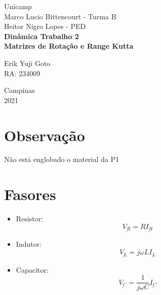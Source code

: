 \documentclass[a4paper, 12pt]{article}
\begin{document}
%
\begin{titlepage} %
	\begin{center} %
		{\large Unicamp}\\[0.4cm] %
		{\large Marco Lucio Bittencourt - Turma B}\\
		{\large Heitor Nigro Lopes - PED}\\[3.2cm]
		{\bf \huge Dinâmica Trabalho 2}\\[0.2cm] 
		{\bf \large Matrizes de Rotação e Range Kutta}\\[4.9cm]
	\end{center} %
	{\large Erik Yuji Goto}\\ %
	RA: 234009\\[10cm]
	\begin{center}
	
		{\large Campinas}\\[0.2cm]
		{\large 2021}
	\end{center}
\end{titlepage} %


\tableofcontents
\newpage

\section{Observação}
	Não está englobado o material da P1
	\newpage
\section{Fasores}
	\begin{itemize}
		\item Resistor:\begin{equation}
			\underline{V_R} = R\underline{I_R}
		\end{equation}
		\item Indutor:\begin{equation}
			\underline{V_L} = j\omega L\underline{I_L}
		\end{equation}
		\item Capacitor:\begin{equation}
			\underline{V_C} = \frac{1}{j\omega C} \underline{I_C}
		\end{equation}
	\end{itemize}
	
\end{document}
